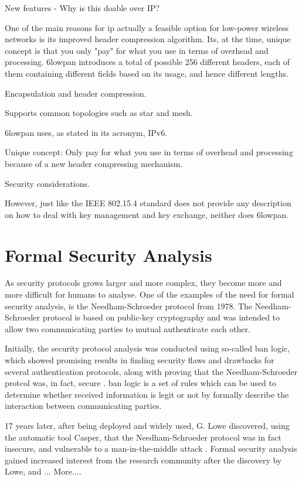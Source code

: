 New features - Why is this doable over IP?

One of the main reasons for \gls{ip} actually a feasible option for low-power wireless networks is its improved header compression algorithm. Its, at the time, unique concept is that you only "pay" for what you use in terms of overhead and processing. \gls{6lowpan} introduces a total of possible 256 different headers, each of them containing different fields based on its usage, and hence different lengths. 

Encapsulation and header compression. 

Supports common topologies such as star and mesh.

\gls{6lowpan} uses, as stated in its acronym, IPv6.

Unique concept: Only pay for what you use in terms of overhead and processing because of a new header compressing mechanism.







Security considerations.

However, just like the IEEE 802.15.4 standard does not provide any description on how to deal with key management and key exchange, neither does \gls{6lowpan}.	

\section{Formal Security Analysis} 


As security protocols grows larger and more complex, they become more and more difficult for humans to analyse. One of the examples of the need for formal security analysis, is the Needham-Schroeder protocol \cite{Needham:1978} from 1978. The Needham-Schroeder protocol is based on public-key cryptography and was intended to allow two communicating parties to mutual authenticate each other.

Initially, the security protocol analysis was conducted using so-called \gls{ban} logic, which showed promising results in finding security flaws and drawbacks for several authentication protocols, along with proving that the Needham-Schroeder protcol was, in fact, secure \cite{burrows1989logic}. \gls{ban} logic is a set of rules which can be used to determine whether received information is legit or not by formally describe the interaction between communicating parties. 

17 years later, after being deployed and widely used, G. Lowe discovered, using the automatic tool Casper, that the Needham-Schroeder protocol was in fact insecure, and vulnerable to a man-in-the-middle attack \cite{lowe1996}. Formal security analysis gained increased interest from the research community after the discovery by Lowe, and ... More....

